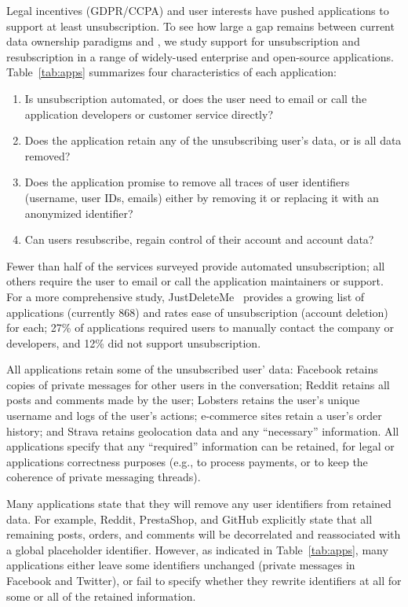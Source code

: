 Legal incentives (GDPR/CCPA) and user interests have pushed applications to support at least
unsubscription. To see how large a gap remains between current data ownership paradigms and \name, we
study support for unsubscription and resubscription in a range of widely-used enterprise and
open-source applications. 
Table~\ref{tab:apps} summarizes four characteristics of each application: 
\begin{enumerate}
    \item Is unsubscription automated, or does the user need to email or call the
application developers or customer service directly? 
    \item Does the application retain any of the unsubscribing user's data, or is all data removed?
    \item Does the application promise to remove all traces of user identifiers (\eg username, user
    IDs, emails) either by removing it or replacing it with an anonymized identifier?  
    \item Can users resubscribe, \ie regain control of their account and account data?
\end{enumerate}
Fewer than half of the services surveyed provide automated unsubscription; all others require the
user to email or call the application maintainers or support. For a more comprehensive study,
JustDeleteMe~\cite{jdm} provides a growing list of applications (currently 868) and rates ease
of unsubscription (account deletion) for each; 27\% of applications required users to manually
contact the company or developers, and 12\% did not support unsubscription. 

All applications retain some of the unsubscribed user' data: Facebook retains copies of private
messages for other users in the conversation; Reddit retains all posts and comments made by the
user; Lobsters retains the user's unique username and logs of the user's actions; e-commerce sites
retain a user's order history; and Strava retains geolocation data and any ``necessary''
information. All applications specify that any ``required'' information can be retained, for legal
or applications correctness purposes (e.g., to process payments, or to keep the coherence of private
messaging threads).  

Many applications state that they will remove any user identifiers from retained data.  For example,
Reddit, PrestaShop, and GitHub explicitly state that all remaining posts, orders, and comments will
be decorrelated and reassociated with a global placeholder identifier.  However, as indicated in
Table~\ref{tab:apps}, many applications either leave some identifiers unchanged (\eg private
messages in Facebook and Twitter), or fail to specify whether they rewrite identifiers at all for
some or all of the retained information.

